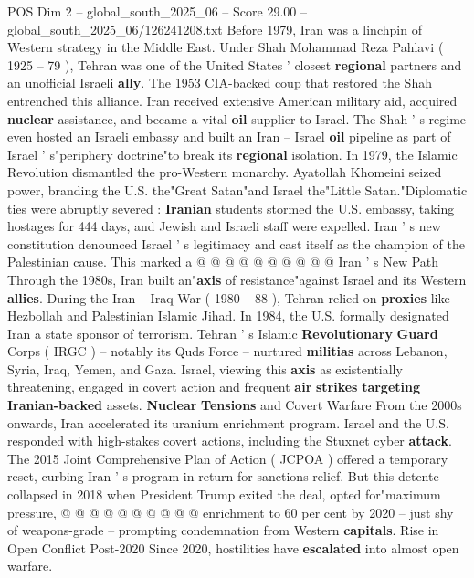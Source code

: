 \begin{textsample}{POS Dim 2 – global\_south\_2025\_06 – Score 29.00 – global\_south\_2025\_06/126241208.txt}  \label{ex:f2_pos_242}
Before 1979, Iran was a linchpin of Western strategy in the Middle East.
Under Shah Mohammad Reza Pahlavi ( 1925 -- 79 ), Tehran was one of the United States ' closest \textbf{regional} partners and an unofficial Israeli \textbf{ally}.
The 1953 CIA-backed coup that restored the Shah entrenched this alliance.
Iran received extensive American military aid, acquired \textbf{nuclear} assistance, and became a vital \textbf{oil} supplier to Israel.
The Shah ' s regime even hosted an Israeli embassy and built an Iran -- Israel \textbf{oil} pipeline as part of Israel ' s"periphery doctrine"to break its \textbf{regional} isolation.
In 1979, the Islamic Revolution dismantled the pro-Western monarchy.
Ayatollah Khomeini seized power, branding the U.S. the"Great Satan"and Israel the"Little Satan."Diplomatic ties were abruptly severed : \textbf{Iranian} students stormed the U.S. embassy, taking hostages for 444 days, and Jewish and Israeli staff were expelled.
Iran ' s new constitution denounced Israel ' s legitimacy and cast itself as the champion of the Palestinian cause.
This marked a @ @ @ @ @ @ @ @ @ @ Iran ' s New Path Through the 1980s, Iran built an"\textbf{axis} of resistance"against Israel and its Western \textbf{allies}.
During the Iran -- Iraq War ( 1980 -- 88 ), Tehran relied on \textbf{proxies} like Hezbollah and Palestinian Islamic Jihad.
In 1984, the U.S. formally designated Iran a state sponsor of terrorism.
Tehran ' s Islamic \textbf{Revolutionary} \textbf{Guard} Corps ( IRGC ) -- notably its Quds Force -- nurtured \textbf{militias} across Lebanon, Syria, Iraq, Yemen, and Gaza.
Israel, viewing this \textbf{axis} as existentially threatening, engaged in covert action and frequent \textbf{air} \textbf{strikes} \textbf{targeting} \textbf{Iranian-backed} assets. \textbf{Nuclear} \textbf{Tensions} and Covert Warfare From the 2000s onwards, Iran accelerated its uranium enrichment program.
Israel and the U.S. responded with high-stakes covert actions, including the Stuxnet cyber \textbf{attack}.
The 2015 Joint Comprehensive Plan of Action ( JCPOA ) offered a temporary reset, curbing Iran ' s program in return for sanctions relief.
But this detente collapsed in 2018 when President Trump exited the deal, opted for"maximum pressure, @ @ @ @ @ @ @ @ @ @ enrichment to 60 per cent by 2020 -- just shy of weapons-grade -- prompting condemnation from Western \textbf{capitals}.
Rise in Open Conflict Post-2020 Since 2020, hostilities have \textbf{escalated} into almost open warfare.

\end{textsample}

